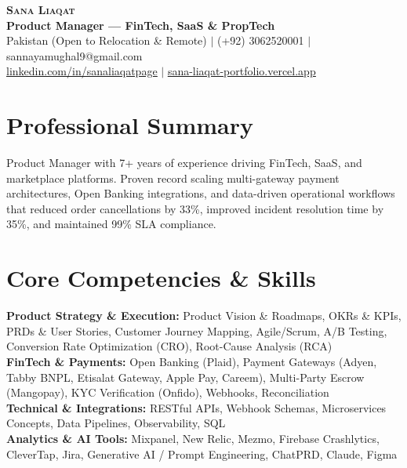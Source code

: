 \documentclass[letterpaper,10pt]{article}
\begin{document}
\begin{center}
    \textbf{\Huge \scshape Sana Liaqat} \\ \vspace{2pt}
    \textbf{\large Product Manager — FinTech, SaaS \& PropTech} \\ \vspace{3pt}
    \small Pakistan (Open to Relocation \& Remote) $|$ (+92) 3062520001 $|$ sannayamughal9@gmail.com \\
    \small \href{https://www.linkedin.com/in/sanaliaqatpage/}{\underline{linkedin.com/in/sanaliaqatpage}} $|$ \href{https://sana-liaqat-portfolio.vercel.app/}{\underline{sana-liaqat-portfolio.vercel.app}}
\end{center}

\section{Professional Summary}
\small{
Product Manager with 7+ years of experience driving FinTech, SaaS, and marketplace platforms. Proven record scaling multi-gateway payment architectures, Open Banking integrations, and data-driven operational workflows that reduced order cancellations by 33\%, improved incident resolution time by 35\%, and maintained 99\% SLA compliance.
}

\section{Core Competencies \& Skills}
\begin{itemize}[leftmargin=0.15in, label={}]
    \small{\item{
     \textbf{Product Strategy \& Execution:} Product Vision \& Roadmaps, OKRs \& KPIs, PRDs \& User Stories, Customer Journey Mapping, Agile/Scrum, A/B Testing, Conversion Rate Optimization (CRO), Root-Cause Analysis (RCA) \\
     \textbf{FinTech \& Payments:} Open Banking (Plaid), Payment Gateways (Adyen, Tabby BNPL, Etisalat Gateway, Apple Pay, Careem), Multi-Party Escrow (Mangopay), KYC Verification (Onfido), Webhooks, Reconciliation \\
     \textbf{Technical \& Integrations:} RESTful APIs, Webhook Schemas, Microservices Concepts, Data Pipelines, Observability, SQL \\
     \textbf{Analytics \& AI Tools:} Mixpanel, New Relic, Mezmo, Firebase Crashlytics, CleverTap, Jira, Generative AI / Prompt Engineering, ChatPRD, Claude, Figma
    }}
\end{itemize}
\end{document}
